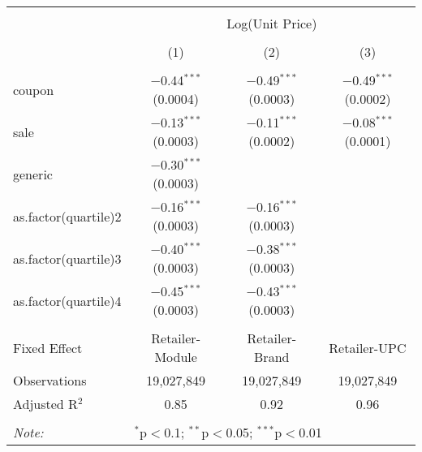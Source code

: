 
\begin{table}[!htbp] \centering 
  \caption{} 
  \label{tab:overallSavingsNonStorable} 
\begin{tabular}{@{\extracolsep{5pt}}lccc} 
\\[-1.8ex]\hline 
\hline \\[-1.8ex] 
 & \multicolumn{3}{c}{Log(Unit Price)} \\ 
\\[-1.8ex] & (1) & (2) & (3)\\ 
\hline \\[-1.8ex] 
 coupon & $-$0.44$^{***}$ (0.0004) & $-$0.49$^{***}$ (0.0003) & $-$0.49$^{***}$ (0.0002) \\ 
  sale & $-$0.13$^{***}$ (0.0003) & $-$0.11$^{***}$ (0.0002) & $-$0.08$^{***}$ (0.0001) \\ 
  generic & $-$0.30$^{***}$ (0.0003) &  &  \\ 
  as.factor(quartile)2 & $-$0.16$^{***}$ (0.0003) & $-$0.16$^{***}$ (0.0003) &  \\ 
  as.factor(quartile)3 & $-$0.40$^{***}$ (0.0003) & $-$0.38$^{***}$ (0.0003) &  \\ 
  as.factor(quartile)4 & $-$0.45$^{***}$ (0.0003) & $-$0.43$^{***}$ (0.0003) &  \\ 
 \hline \\[-1.8ex] 
Fixed Effect & Retailer-Module & Retailer-Brand & Retailer-UPC \\ 
Observations & 19,027,849 & 19,027,849 & 19,027,849 \\ 
Adjusted R$^{2}$ & 0.85 & 0.92 & 0.96 \\ 
\hline 
\hline \\[-1.8ex] 
\textit{Note:}  & \multicolumn{3}{l}{$^{*}$p$<$0.1; $^{**}$p$<$0.05; $^{***}$p$<$0.01} \\ 
\end{tabular} 
\end{table} 
